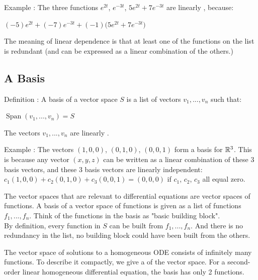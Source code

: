 \documentclass[11pt, openright]{book}
\begin{document}
\begin{dent}{Example :}
    The three functions $e^{2t}$, $e^{-3t}$, $5e^{2t}+7e^{-3t}$ are linearly , because:\\
    \centerline{$(-5)e^{2t}+(-7)e^{-3t}+(-1)\big(5e^{2t}+7e^{-3t}\big)$}

    The meaning of linear dependence is that at least one of the functions on the list is redundant (and can be expressed as a linear combination of the others.)
\end{dent}

\subsection{A Basis}

\begin{dent}{Definition :}
    A basis of a vector space $S$ is a list of vectors $v_1,...,v_n$ such that:
    \begin{items}{-10pt}{-10pt}
        \item $\operatorname{Span}(v_1,...,v_n)=S$
        \item The vectors $v_1,...,v_n$ are linearly .
    \end{items}
\end{dent}

\begin{dent}{Example :}
    The vectors $(1,0,0)$, $(0,1,0)$, $(0,0,1)$ form a basis for $\mathbb{R}^3$. This is because any vector $(x,y,z)$ can be written as a linear combination of these 3 basis vectors, and these 3 basis vectors are linearly independent:
    $c_1(1,0,0)+c_2(0,1,0)+c_3(0,0,1)=(0,0,0)$  if $c_1$, $c_2$, $c_3$ all equal zero.
\end{dent}

The vector spaces that are relevant to differential equations are vector spaces of functions. A basis of a vector space of
functions is given as a list of functions $f_1,...,f_n$. Think of the functions in the basis as "basic building block".\\
By definition, every function in $S$ can be built from $f_1,...,f_n$. And there is no redundancy in the list, no
building block could have been built from the others.

The vector space of solutions to a homogeneous ODE consists of infinitely many functions. To describe it compactly,
we give a  of the vector space. For a second-order linear homogeneous differential equation, the basis has only 2 functions.
\end{document}
